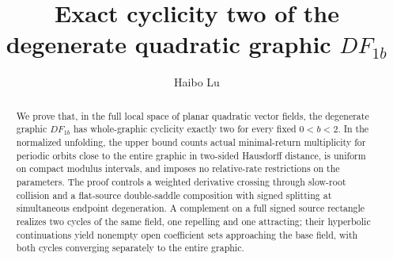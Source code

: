 \documentclass[a4paper,11pt]{amsart}
\title[Exact cyclicity two of $DF_{1b}$]{Exact cyclicity two of the degenerate quadratic graphic $DF_{1b}$}
\author{Haibo Lu}
\date{}
\theoremstyle{definition}
\theoremstyle{remark}
\numberwithin{equation}{section}
\begin{document}
\begin{abstract}
We prove that, in the full local space of planar quadratic vector fields,
the degenerate graphic $DF_{1b}$ has whole-graphic cyclicity exactly two
for every fixed $0<b<2$. In the normalized unfolding, the upper bound
counts actual minimal-return multiplicity for periodic orbits close to
the entire graphic in two-sided Hausdorff distance, is uniform on compact
modulus intervals, and imposes no relative-rate restrictions on the
parameters. The proof controls a weighted derivative crossing through
slow-root collision and a flat-source double-saddle composition with
signed splitting at simultaneous endpoint degeneration. A complement on
a full signed source rectangle realizes two cycles of the same field,
one repelling and one attracting; their hyperbolic continuations yield
nonempty open coefficient sets approaching the base field, with both
cycles converging separately to the entire graphic.
\end{abstract}
\maketitle
\enlargethispage{3pt}










\appendix








\end{document}
